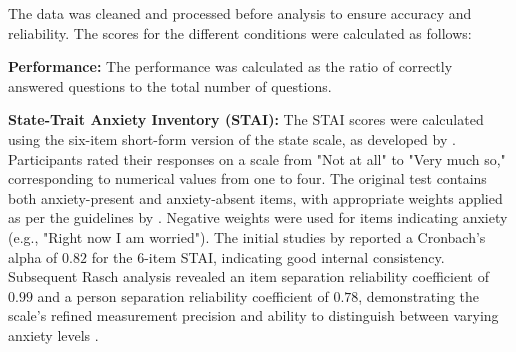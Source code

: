The data was cleaned and processed before analysis to ensure accuracy and reliability. The scores for the different conditions were calculated as follows:

\begin{APAitemize}
\item \textbf{Performance:} The performance was calculated as the ratio of correctly answered questions to the total number of questions.
\item \textbf{State-Trait Anxiety Inventory (STAI):} The STAI scores were calculated using the six-item short-form version of the state scale, as developed by \textcite{marteauDevelopmentSixitemShortform1992}. Participants rated their responses on a scale from "Not at all" to "Very much so," corresponding to numerical values from one to four. The original test contains both anxiety-present and anxiety-absent items, with appropriate weights applied as per the guidelines by \textcite{courtMeasuringPatientAnxiety2010}. Negative weights were used for items indicating anxiety (e.g., "Right now I am worried"). The initial studies by \textcite{marteauDevelopmentSixitemShortform1992} reported a Cronbach's alpha of $0.82$ for the 6-item STAI, indicating good internal consistency. Subsequent Rasch analysis revealed an item separation reliability coefficient of $0.99$ and a person separation reliability coefficient of $0.78$, demonstrating the scale's refined measurement precision and ability to distinguish between varying anxiety levels \cite{courtMeasuringPatientAnxiety2010}.

\end{APAitemize}